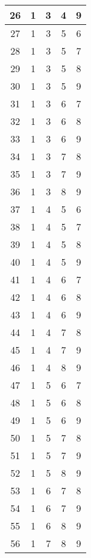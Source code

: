 \begin{longtable}{c | c c c c}
			\midrule 
			\multicolumn{1}{c|}{26} & 1 & 3 & 4 & 9 \\ 
			\midrule 
			\multicolumn{1}{c|}{27} & 1 & 3 & 5 & 6 \\ 
			\midrule 
			\multicolumn{1}{c|}{28} & 1 & 3 & 5 & 7 \\ 
			\midrule 
			\multicolumn{1}{c|}{29} & 1 & 3 & 5 & 8 \\ 
			\midrule 
			\multicolumn{1}{c|}{30} & 1 & 3 & 5 & 9 \\ 
			\midrule 
			\multicolumn{1}{c|}{31} & 1 & 3 & 6 & 7 \\ 
			\midrule 
			\multicolumn{1}{c|}{32} & 1 & 3 & 6 & 8 \\ 
			\midrule 
			\multicolumn{1}{c|}{33} & 1 & 3 & 6 & 9 \\ 
			\midrule 
			\multicolumn{1}{c|}{34} & 1 & 3 & 7 & 8 \\ 
			\midrule 
			\multicolumn{1}{c|}{35} & 1 & 3 & 7 & 9 \\ 
			\midrule 
			\multicolumn{1}{c|}{36} & 1 & 3 & 8 & 9 \\ 
			\midrule 
			\multicolumn{1}{c|}{37} & 1 & 4 & 5 & 6 \\ 
			\midrule 
			\multicolumn{1}{c|}{38} & 1 & 4 & 5 & 7 \\ 
			\midrule 
			\multicolumn{1}{c|}{39} & 1 & 4 & 5 & 8 \\ 
			\midrule 
			\multicolumn{1}{c|}{40} & 1 & 4 & 5 & 9 \\ 
			\midrule 
			\multicolumn{1}{c|}{41} & 1 & 4 & 6 & 7 \\ 
			\midrule 
			\multicolumn{1}{c|}{42} & 1 & 4 & 6 & 8 \\ 
			\midrule 
			\multicolumn{1}{c|}{43} & 1 & 4 & 6 & 9 \\ 
			\midrule 
			\multicolumn{1}{c|}{44} & 1 & 4 & 7 & 8 \\ 
			\midrule 
			\multicolumn{1}{c|}{45} & 1 & 4 & 7 & 9 \\ 
			\midrule 
			\multicolumn{1}{c|}{46} & 1 & 4 & 8 & 9 \\ 
			\midrule 
			\multicolumn{1}{c|}{47} & 1 & 5 & 6 & 7 \\ 
			\midrule 
			\multicolumn{1}{c|}{48} & 1 & 5 & 6 & 8 \\ 
			\midrule 
			\multicolumn{1}{c|}{49} & 1 & 5 & 6 & 9 \\ 
			\midrule 
			\multicolumn{1}{c|}{50} & 1 & 5 & 7 & 8 \\ 
			\midrule 
			\multicolumn{1}{c|}{51} & 1 & 5 & 7 & 9 \\ 
			\midrule 
			\multicolumn{1}{c|}{52} & 1 & 5 & 8 & 9 \\ 
			\midrule 
			\multicolumn{1}{c|}{53} & 1 & 6 & 7 & 8 \\ 
			\midrule 
			\multicolumn{1}{c|}{54} & 1 & 6 & 7 & 9 \\ 
			\midrule 
			\multicolumn{1}{c|}{55} & 1 & 6 & 8 & 9 \\ 
			\midrule 
			\multicolumn{1}{c|}{56} & 1 & 7 & 8 & 9 \\ 
			\bottomrule 
			
		\end{longtable}

